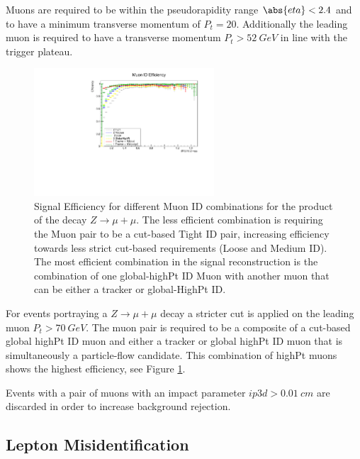 Muons are required to be within the pseudorapidity range $\abs{eta}<2.4$ and
to have a minimum transverse momentum of $P_t=20$. Additionally the leading muon
is required to have a transverse momentum $P_t>52~GeV$ in line with
the trigger plateau.

\begin{figure}[tph]
  \centering
  \includegraphics[width=0.6\textwidth]{fig/LeptonIDStudies/MuonIDEfficiency.pdf}
  \caption{Signal Efficiency for different Muon ID combinations for the product of
    the decay $Z\rightarrow\mu+\mu$. The less efficient combination is requiring
    the Muon pair to be a cut-based Tight ID pair, increasing efficiency towards less
    strict cut-based requirements (Loose and Medium ID). The most efficient combination in
    the signal reconstruction is the combination of one global-highPt ID Muon
    with another muon that can be either a tracker or global-HighPt ID.}
  \label{fig:MuonIDEfficiency}
\end{figure}

For events portraying a $Z\rightarrow\mu+\mu$ decay a stricter cut is applied on the
leading muon $P_{t}>70~GeV$. The muon pair is required to be a composite of a
cut-based global highPt ID muon and either a tracker or global highPt ID muon
that is simultaneously a particle-flow candidate. This combination of highPt
muons shows the highest efficiency, see Figure \ref{fig:MuonIDEfficiency}.

Events with a pair of muons with an impact parameter $ip3d>0.01~cm$ are
discarded in order to increase background rejection.



\subsection{Lepton Misidentification}

